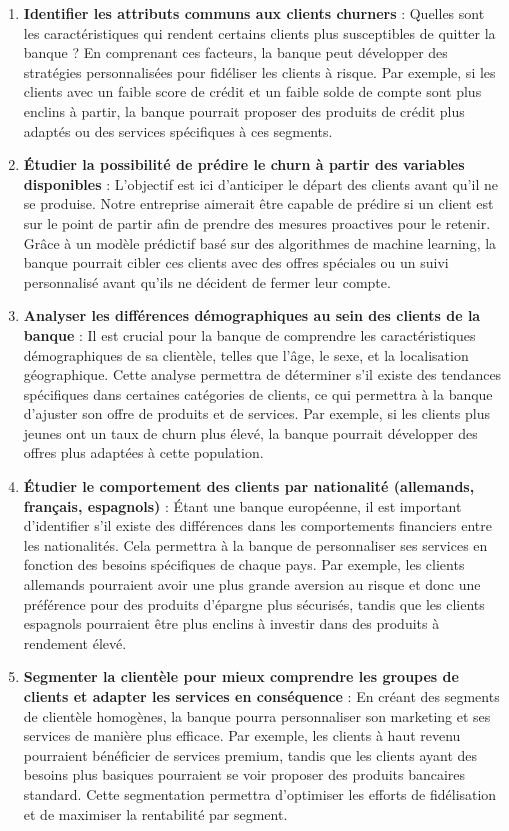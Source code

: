 \documentclass{article}
\begin{document}
\begin{enumerate}
    \item \textbf{Identifier les attributs communs aux clients churners} : Quelles sont les caractéristiques qui rendent certains clients plus susceptibles de quitter la banque ? En comprenant ces facteurs, la banque peut développer des stratégies personnalisées pour fidéliser les clients à risque. Par exemple, si les clients avec un faible score de crédit et un faible solde de compte sont plus enclins à partir, la banque pourrait proposer des produits de crédit plus adaptés ou des services spécifiques à ces segments.
    
    \item \textbf{Étudier la possibilité de prédire le churn à partir des variables disponibles} : L’objectif est ici d'anticiper le départ des clients avant qu'il ne se produise. Notre entreprise aimerait être capable de prédire si un client est sur le point de partir afin de prendre des mesures proactives pour le retenir. Grâce à un modèle prédictif basé sur des algorithmes de machine learning, la banque pourrait cibler ces clients avec des offres spéciales ou un suivi personnalisé avant qu'ils ne décident de fermer leur compte.
    
    \item \textbf{Analyser les différences démographiques au sein des clients de la banque} : Il est crucial pour la banque de comprendre les caractéristiques démographiques de sa clientèle, telles que l’âge, le sexe, et la localisation géographique. Cette analyse permettra de déterminer s’il existe des tendances spécifiques dans certaines catégories de clients, ce qui permettra à la banque d’ajuster son offre de produits et de services. Par exemple, si les clients plus jeunes ont un taux de churn plus élevé, la banque pourrait développer des offres plus adaptées à cette population.
    
    \item \textbf{Étudier le comportement des clients par nationalité (allemands, français, espagnols)} : Étant une banque européenne, il est important d’identifier s’il existe des différences dans les comportements financiers entre les nationalités. Cela permettra à la banque de personnaliser ses services en fonction des besoins spécifiques de chaque pays. Par exemple, les clients allemands pourraient avoir une plus grande aversion au risque et donc une préférence pour des produits d’épargne plus sécurisés, tandis que les clients espagnols pourraient être plus enclins à investir dans des produits à rendement élevé.
    
    \item \textbf{Segmenter la clientèle pour mieux comprendre les groupes de clients et adapter les services en conséquence} : En créant des segments de clientèle homogènes, la banque pourra personnaliser son marketing et ses services de manière plus efficace. Par exemple, les clients à haut revenu pourraient bénéficier de services premium, tandis que les clients ayant des besoins plus basiques pourraient se voir proposer des produits bancaires standard. Cette segmentation permettra d’optimiser les efforts de fidélisation et de maximiser la rentabilité par segment.
\end{enumerate}
\end{document}
